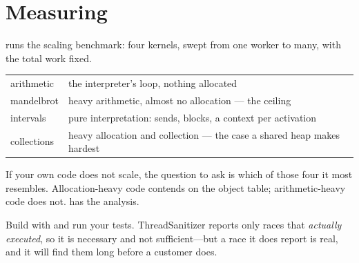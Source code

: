 \section{Measuring}

 runs the scaling benchmark: four kernels, swept from one
worker to many, with the total work fixed.

\begin{center}
\small
\begin{tabular}{@{}lp{}@{}}
\toprule
arithmetic & the interpreter's loop, nothing allocated\\
mandelbrot & heavy arithmetic, almost no allocation --- the ceiling\\
intervals & pure interpretation: sends, blocks, a context per activation\\
collections & heavy allocation and collection --- the case a shared heap makes
  hardest\\
\bottomrule
\end{tabular}
\end{center}

If your own code does not scale, the question to ask is which of those four it
most resembles. Allocation-heavy code contends on the object table;
arithmetic-heavy code does not.  has the analysis.

\begin{stnote}
Build with  and run your tests. ThreadSanitizer reports only races
that \emph{actually executed}, so it is necessary and not sufficient---but a
race it does report is real, and it will find them long before a customer
does.
\end{stnote}
